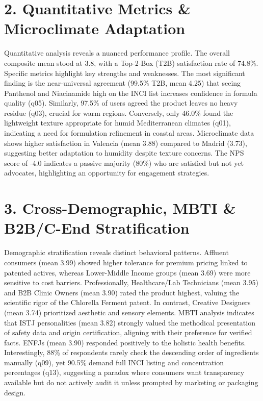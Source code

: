 \documentclass[10pt,twocolumn,a4paper]{article}
\begin{document}
\section{2. Quantitative Metrics \& Microclimate Adaptation}
Quantitative analysis reveals a nuanced performance profile. The overall composite mean stood at 3.8, with a Top-2-Box (T2B) satisfaction rate of 74.8\%. Specific metrics highlight key strengths and weaknesses. The most significant finding is the near-universal agreement (99.5\% T2B, mean 4.25) that seeing Panthenol and Niacinamide high on the INCI list increases confidence in formula quality (q05). Similarly, 97.5\% of users agreed the product leaves no heavy residue (q03), crucial for warm regions. Conversely, only 46.0\% found the lightweight texture appropriate for humid Mediterranean climates (q01), indicating a need for formulation refinement in coastal areas. Microclimate data shows higher satisfaction in Valencia (mean 3.88) compared to Madrid (3.73), suggesting better adaptation to humidity despite texture concerns. The NPS score of -4.0 indicates a passive majority (80\%) who are satisfied but not yet advocates, highlighting an opportunity for engagement strategies.
\section{3. Cross-Demographic, MBTI \& B2B/C-End Stratification}
Demographic stratification reveals distinct behavioral patterns. Affluent consumers (mean 3.99) showed higher tolerance for premium pricing linked to patented actives, whereas Lower-Middle Income groups (mean 3.69) were more sensitive to cost barriers. Professionally, Healthcare/Lab Technicians (mean 3.95) and B2B Clinic Owners (mean 3.90) rated the product highest, valuing the scientific rigor of the Chlorella Ferment patent. In contrast, Creative Designers (mean 3.74) prioritized aesthetic and sensory elements. MBTI analysis indicates that ISTJ personalities (mean 3.82) strongly valued the methodical presentation of safety data and origin certification, aligning with their preference for verified facts. ENFJs (mean 3.90) responded positively to the holistic health benefits. Interestingly, 88\% of respondents rarely check the descending order of ingredients manually (q09), yet 90.5\% demand full INCI listing and concentration percentages (q13), suggesting a paradox where consumers want transparency available but do not actively audit it unless prompted by marketing or packaging design.
\end{document}
